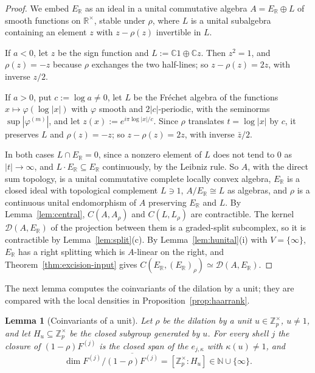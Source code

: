 \documentclass[11pt]{amsart}
\newtheorem{lemma}[theorem]{Lemma}
\theoremstyle{definition}
\theoremstyle{remark}
\newcommand{\C}{\mathbb C}
\newcommand{\R}{\mathbb R}
\newcommand{\N}{\mathbb N}
\newcommand{\Z}{\mathbb Z}
\begin{document}
\begin{proof}
We embed $E_{\R}$ as an ideal in a unital commutative algebra $A=E_{\R}\oplus
L$ of smooth functions on $\R^{\times}$, stable under $\rho$, where $L$ is a
unital subalgebra containing an element $z$ with $z-\rho(z)$ invertible in
$L$.

If $a<0$, let $z$ be the sign function and $L:=\C1\oplus\C z$.  Then $z^{2}=1$,
and $\rho(z)=-z$ because $\rho$ exchanges the two half-lines; so
$z-\rho(z)=2z$, with inverse $z/2$.

If $a>0$, put $c:=\log a\ne0$, let $L$ be the Fr\'echet algebra of the
functions $x\mapsto\varphi(\log|x|)$ with $\varphi$ smooth and $2|c|$-periodic,
with the seminorms $\sup|\varphi^{(m)}|$, and let $z(x):=e^{i\pi\log|x|/c}$.
Since $\rho$ translates $t=\log|x|$ by $c$, it preserves $L$ and
$\rho(z)=-z$; so $z-\rho(z)=2z$, with inverse $\bar z/2$.

In both cases $L\cap E_{\R}=0$, since a nonzero element of $L$ does not tend to
$0$ as $|t|\to\infty$, and $L\cdot E_{\R}\subseteq E_{\R}$ continuously, by the
Leibniz rule.  So $A$, with the direct sum topology, is a unital commutative
complete locally convex algebra, $E_{\R}$ is a closed ideal with topological
complement $L\ni1$, $A/E_{\R}\cong L$ as algebras, and $\rho$ is a continuous
unital endomorphism of $A$ preserving $E_{\R}$ and $L$.  By
Lemma~\ref{lem:central}, $C(A,A_{\rho})$ and $C(L,L_{\rho})$ are
contractible.  The kernel $\mathcal D(A,E_{\R})$ of the projection between them
is a graded-split subcomplex, so it is contractible by
Lemma~\ref{lem:split}(c).  By Lemma~\ref{lem:hunital}(i) with $V=\{\infty\}$,
$E_{\R}$ has a right splitting which is $A$-linear on the right, and
Theorem~\ref{thm:excision-input} gives
$C(E_{\R},(E_{\R})_{\rho})\simeq\mathcal D(A,E_{\R})$.
\end{proof}

The next lemma computes the coinvariants of the dilation by a unit; they are
compared with the local densities in Proposition~\ref{prop:haarrank}.

\begin{lemma}[Coinvariants of a unit]\label{lem:coinv}
Let $\rho$ be the dilation by a unit $u\in\Z_p^{\times}$, $u\ne1$, and let
$H_u\subseteq\Z_p^{\times}$ be the closed subgroup generated by $u$.  For every
shell $j$ the closure of $(1-\rho)F^{(j)}$ is the closed span of the
$e_{j,\kappa}$ with $\kappa(u)\ne1$, and
\[
\dim F^{(j)}/\overline{(1-\rho)F^{(j)}}=[\Z_p^{\times}:H_u]\in\N\cup\{\infty\}.
\]
\end{lemma}
\end{document}
